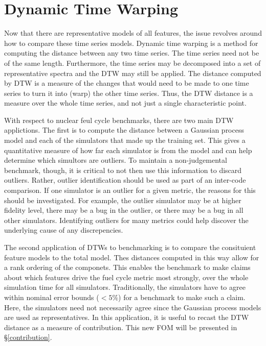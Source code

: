 \clearpage
\section{Dynamic Time Warping}
\label{dtw}

Now that there are representative models of all features, the issue revolves 
around how to compare these time series models. Dynamic time warping \cite{muller}
is a method for computing the distance between any two time series. The time 
series need not be of the same length.  Furthermore, the time series may be 
decomposed into a set of representative spectra and the DTW may still be applied.
The distance computed by DTW is a measure of the changes that would need to be 
made to one time series to turn it into (warp) the other time series. Thus, 
the DTW distance is a measure over the whole time series, and not just a 
single characteristic point.

With respect to nuclear feul cycle benchmarks, there are two main DTW applictions.
The first is to compute the distance between a Gaussian process model and each of 
the simulators that made up the training set.  This gives a quantitative measure 
of how far each simulator is from the model and can help determine which 
simultors are outliers. To maintain a non-judgemental benchmark, though, it is 
critical to not then use this information to discard outliers.  Rather, outlier
identification should be used as part of an inter-code comparison. If one simulator
is an outlier for a given metric, the reasons for this should be investigated. 
For example, the outlier simulator may be at higher fidelity level, there may be 
a bug in the outlier, or there may be a bug in all other simulators. Identifying 
outliers for many metrics could help discover the underlying cause of any 
discrepencies.

The second application of DTWs to benchmarking is to compare the consituient 
feature models to the total model.  Thes distances computed in this way allow 
for a rank ordering of the componets.  This enables the benchmark to make claims
about which features drive the fuel cycle metric most strongly, over the whole 
simulation time for all simulators. Traditionally, the simulators have to agree
within nominal error bounds ($<5\%$) for a benchmark to make such a claim.  Here,
the simulators need not necessarily agree since the Gaussian process models are
used as representatives.  In this application, it is useful to recast the DTW 
distance as a measure of contribution.  This new FOM will be presented in 
\S\ref{contribution}.


